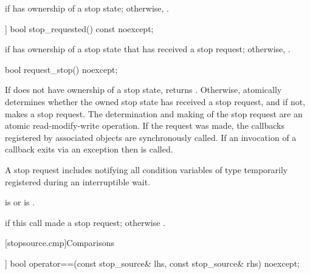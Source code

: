 \begin{itemdescr}
\pnum
\returns
{} if  has ownership of a stop state;
otherwise, .
\end{itemdescr}

%
\begin{itemdecl}
[[nodiscard]] bool stop_requested() const noexcept;
\end{itemdecl}

\begin{itemdescr}
\pnum
\returns
{} if  has ownership of a stop state
that has received a stop request;
otherwise, .
\end{itemdescr}


%
\begin{itemdecl}
bool request_stop() noexcept;
\end{itemdecl}

\begin{itemdescr}
\pnum
\effects
If  does not have ownership of a stop state, returns .
Otherwise, atomically determines whether the owned stop state
has received a stop request,
and if not, makes a stop request.
The determination and making of the stop request are an
atomic read-modify-write operation.
If the request was made,
the callbacks registered by associated  objects
are synchronously called.
If an invocation of a callback exits via an exception
then  is called.
\begin{note}
A stop request includes notifying all condition variables
of type 
temporarily registered during
an interruptible wait.
\end{note}

\pnum
\ensures
{} is 
or  is .

\pnum
\returns
{} if this call made a stop request;
otherwise .
\end{itemdescr}

[stopsource.cmp]{Comparisons}

%
\begin{itemdecl}
[[nodiscard]] bool operator==(const stop_source& lhs, const stop_source& rhs) noexcept;
\end{itemdecl}

